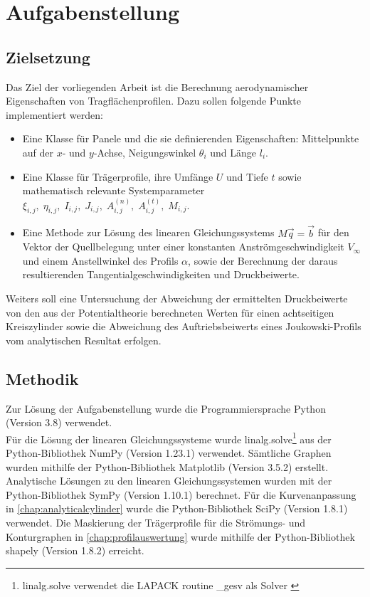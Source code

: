\chapter{Aufgabenstellung}
%
\section{Zielsetzung}
Das Ziel der vorliegenden Arbeit ist die Berechnung  aerodynamischer Eigenschaften von Tragflächenprofilen. Dazu sollen folgende Punkte implementiert werden:
\begin{itemize}
  \item Eine Klasse für Panele und die sie definierenden Eigenschaften: Mittelpunkte auf der $x$- und $y$-Achse, Neigungswinkel $\theta_{i}$ und Länge $l_i$. %
  \item Eine Klasse für Trägerprofile, ihre Umfänge $U$ und Tiefe $t$ sowie mathematisch relevante Systemparameter $\xi_{i,j}, \; \eta_{i,j}, \; I_{i,j}, \; J_{i,j}, \; A_{i,j}^{(n)}, \;A_{i,j}^{(t)}, \;M_{i,j}$.
  \item Eine Methode zur Lösung des linearen Gleichungssystems $M \vec q = \vec b$ für den Vektor der Quellbelegung unter einer konstanten Anströmgeschwindigkeit $V_{\infty}$ und einem Anstellwinkel des Profils $\alpha $, sowie der Berechnung der daraus resultierenden Tangentialgeschwindigkeiten und Druckbeiwerte.
\end{itemize}
Weiters soll eine Untersuchung der Abweichung der ermittelten Druckbeiwerte von den aus der Potentialtheorie berechneten Werten für einen achtseitigen Kreiszylinder sowie die Abweichung des Auftriebsbeiwerts eines Joukowski-Profils vom analytischen Resultat erfolgen.

\section{Methodik}
Zur Lösung der Aufgabenstellung wurde die Programmiersprache Python (Version 3.8) verwendet. \cite{python2009} \\Für die Lösung der linearen Gleichungssysteme wurde linalg.solve\footnote{linalg.solve verwendet die LAPACK routine \_gesv als Solver \cite{harris2020array}} aus der Python-Bibliothek NumPy (Version 1.23.1) verwendet. \cite{harris2020array} Sämtliche Graphen wurden mithilfe der Python-Bibliothek Matplotlib (Version 3.5.2) erstellt. \cite{Hunter:2007} Analytische Lösungen zu den linearen Gleichungssystemen  wurden mit der Python-Bibliothek SymPy (Version 1.10.1) berechnet. \cite{Sympy} Für die Kurvenanpassung in \ref{chap:analyticalcylinder} wurde die Python-Bibliothek SciPy (Version 1.8.1) verwendet. \cite{2020SciPy-NMeth} Die Maskierung der Trägerprofile für die Strömungs- und Konturgraphen in \ref{chap:profilauswertung} wurde mithilfe der Python-Bibliothek shapely (Version 1.8.2) erreicht. \cite{shapely2007}